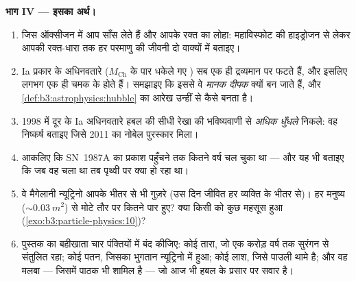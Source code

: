 \begin{problem}
\medskip\noindent\textbf{भाग IV --- इसका अर्थ।}

\begin{enumerate}[resume]
  \item जिस ऑक्सीजन में आप साँस लेते हैं और आपके रक्त का लोहा:
        महाविस्फोट की हाइड्रोजन से लेकर आपकी रक्त-धारा तक हर परमाणु
        की जीवनी दो वाक्यों में बताइए।
  \item Ia प्रकार के अधिनवतारे ($M_{\text{Ch}}$ के पार धकेले गए
        ) सब एक ही द्रव्यमान पर फटते हैं, और इसलिए
        लगभग एक ही चमक के होते हैं। समझाइए कि इससे वे
        \emph{मानक दीपक} क्यों बन जाते हैं, और
        \cref{def:b3:astrophysics:hubble} का आरेख उन्हीं से कैसे
        बनता है।
  \item 1998 में दूर के Ia अधिनवतारे हबल की सीधी रेखा की
        भविष्यवाणी से \emph{अधिक धुँधले} निकले: वह निष्कर्ष बताइए
        जिसे 2011 का नोबेल पुरस्कार मिला।
  \item आकलिए कि SN~1987A का प्रकाश पहुँचने तक कितने वर्ष चल चुका
        था --- और यह भी बताइए कि जब वह चला था तब पृथ्वी पर क्या
        हो रहा था।
  \item वे मैगेलानी न्यूट्रिनो आपके भीतर से भी गुज़रे (उस दिन जीवित
        हर व्यक्ति के भीतर से)। हर मनुष्य
        (${\sim}\qty{0.03}{m^2}$) से मोटे तौर पर कितने पार हुए? क्या
        किसी को कुछ महसूस हुआ (\cref{exo:b3:particle-physics:10})?
  \item पुस्तक का बहीखाता चार पंक्तियों में बंद कीजिए: कोई तारा, जो
        एक करोड़ वर्ष तक सुरंगन से संतुलित रहा; कोई पतन, जिसका
        भुगतान न्यूट्रिनो में हुआ; कोई लाश, जिसे पाउली थामे है; और
        वह मलबा --- जिसमें पाठक भी शामिल है --- जो आज भी
        हबल के प्रसार पर सवार है।
\end{enumerate}
\end{problem}
